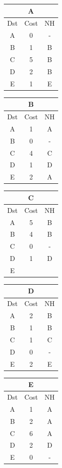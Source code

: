 \documentclass[10pt]{article}
\begin{document}
			\begin{table}[h!]
				\begin{tabular}{|c||c||c|}
					\hline
					\multicolumn{3}{|c|}{A} \\
					\hline
					Dst & Cost & NH \\
					\hline
					A & 0 & - \\
					B & 1 & B \\
					C & 5 & B \\
					D & 2 & B \\
					E & 1 & E \\
					\hline
				\end{tabular}
				\begin{tabular}{|c||c||c|}
					\hline
					\multicolumn{3}{|c|}{B} \\
					\hline
					Dst & Cost & NH \\
					\hline
					A & 1 & A \\
					B & 0 & - \\
					C & 4 & C \\
					D & 1 & D \\
					E & 2 & A \\
					\hline
				\end{tabular}
				\begin{tabular}{|c||c||c|}
					\hline
					\multicolumn{3}{|c|}{C} \\
					\hline
					Dst & Cost & NH \\
					\hline
					A & 5 & B \\
					B & 4 & B \\
					C & 0 & - \\
					D & 1 & D \\
					E &   &   \\
					\hline
				\end{tabular}
				\begin{tabular}{|c||c||c|}
					\hline
					\multicolumn{3}{|c|}{D} \\
					\hline
					Dst & Cost & NH \\
					\hline
					A & 2 & B \\
					B & 1 & B \\
					C & 1 & C \\
					D & 0 & - \\
					E & 2 & E \\
					\hline
				\end{tabular}
				\begin{tabular}{|c||c||c|}
					\hline
					\multicolumn{3}{|c|}{E} \\
					\hline
					Dst & Cost & NH \\
					\hline
					A & 1 & A \\
					B & 2 & A \\
					C & 6 & A \\
					D & 2 & D \\
					E & 0 & - \\
					\hline
				\end{tabular}
			\end{table}
\end{document}
